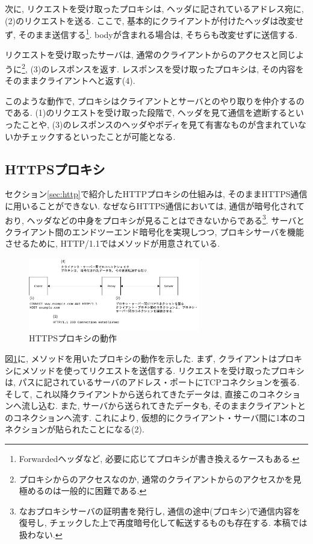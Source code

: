 \documentclass[10pt,a4paper,uplatex,a4j,dvipdfmx]{jsarticle}
\begin{document}
\begin{multicols}{2}
    次に, リクエストを受け取ったプロキシは, ヘッダに記されているアドレス宛に, (2)のリクエストを送る. ここで, 基本的にクライアントが付けたヘッダは改変せず, そのまま送信する\footnote{Forwardedヘッダ\cite{rfc:7239}など, 必要に応じてプロキシが書き換えるケースもある.}. bodyが含まれる場合は, そちらも改変せずに送信する.
    
    リクエストを受け取ったサーバは, 通常のクライアントからのアクセスと同じように\footnote{プロキシからのアクセスなのか, 通常のクライアントからのアクセスかを見極めるのは一般的に困難である.}, (3)のレスポンスを返す. レスポンスを受け取ったプロキシは, その内容をそのままクライアントへと返す(4).
    
    このような動作で, プロキシはクライアントとサーバとのやり取りを仲介するのである. (1)のリクエストを受け取った段階で, ヘッダを見て通信を遮断するといったことや, (3)のレスポンスのヘッダやボディを見て有害なものが含まれていないかチェックするといったことが可能となる.

    \subsection{HTTPSプロキシ}
    セクション\ref{sec:http}で紹介したHTTPプロキシの仕組みは, そのままHTTPS通信に用いることができない. なぜならHTTPS通信においては, 通信が暗号化されており, ヘッダなどの中身をプロキシが見ることはできないからである\footnote{なおプロキシサーバの証明書を発行し, 通信の途中(プロキシ)で通信内容を復号し, チェックした上で再度暗号化して転送するものも存在する. 本稿では扱わない.}.
    サーバとクライアント間のエンドツーエンド暗号化を実現しつつ, プロキシサーバを機能させるために, HTTP/1.1ではメソッドが用意されている\cite{rfc:7231}.

    \begin{figure}[H]
      \center
      \includegraphics[width=7.5cm]{img/proxyhttps.pdf}
      \caption{HTTPSプロキシの動作 \label{img:proxy:https}}
    \end{figure}
    
    図\ref{img:proxy:https}に, メソッドを用いたプロキシの動作を示した.
    まず, クライアントはプロキシにメソッドを使ってリクエストを送信する.
    リクエストを受け取ったプロキシは, パスに記されているサーバのアドレス・ポートにTCPコネクションを張る. そして, これ以降クライアントから送られてきたデータは, 直接このコネクションへ流し込む. また, サーバから送られてきたデータも, そのままクライアントとのコネクションへ流す.
    これにより, 仮想的にクライアント・サーバ間に1本のコネクションが貼られたことになる(2).
    

\end{multicols}
\end{document}
